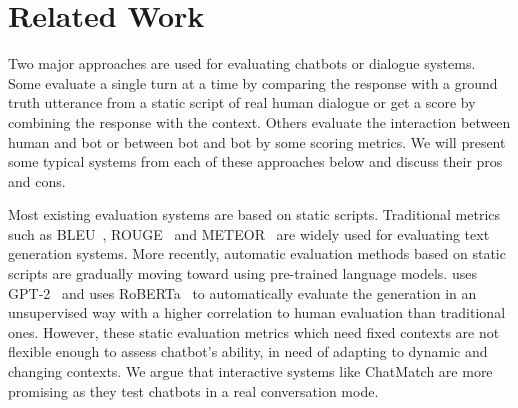 \section{Related Work}

Two major approaches are used for evaluating chatbots or dialogue systems. Some evaluate a single turn at a time by comparing the response with a ground truth utterance from a static script of real human dialogue or get a score by combining the response with the context. Others evaluate the interaction between human and bot or between bot and bot by some scoring metrics. We will present some typical systems from each of these approaches below and discuss their pros and cons. 



Most existing evaluation systems are based on static scripts. 
Traditional metrics such as BLEU~\citep{papineni-etal-2002-bleu}, ROUGE~\citep{lin-2004-rouge} 
and METEOR~\citep{banerjee-lavie-2005-meteor} are widely used 
for evaluating text generation systems.
More recently, 
automatic evaluation methods based on static scripts are gradually 
moving toward using pre-trained language models. 
\citet{pang-etal-2020-towards} uses GPT-2~\citep{gpt2} and
\citet{mehri-eskenazi-2020-usr} uses RoBERTa~\citep{roberta} to 
automatically evaluate the generation in an unsupervised way with
a higher correlation to human evaluation
than traditional ones. 
However, these static evaluation metrics which need fixed contexts are not 
flexible enough to assess chatbot's ability, in need of adapting to dynamic and changing
contexts. We argue that interactive systems like ChatMatch
are more promising as they test chatbots in a real conversation mode. 

